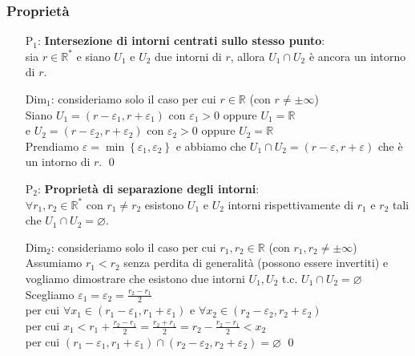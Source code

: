 \documentclass[a4paper]{article}
\begin{document}
\subsubsection*{Proprietà}
\begin{itemize}
	\item[P\(_1\):] \textbf{Intersezione di intorni centrati sullo stesso punto}: \\ sia \(r \in \mathbb{R}^*\) e siano \(U_1\) e \(U_2\) due intorni di \(r\), allora \(U_1 \cap U_2\) è ancora un intorno di \(r\).
	\item[Dim\(_1\):] consideriamo solo il caso per cui \(r \in \mathbb{R}\) (con \(r \neq \pm \infty\)) \\
	Siano \(U_1 = \left( r - \varepsilon_1, r + \varepsilon_1 \right)\) con \(\varepsilon_1 > 0\) oppure \(U_1 = \mathbb{R}\) \\
	e \(U_2 = \left( r - \varepsilon_2, r + \varepsilon_2 \right)\) con \(\varepsilon_2 > 0\) oppure \(U_2 = \mathbb{R}\) \\
	Prendiamo \(\varepsilon = \min \left\{ \varepsilon_1 , \varepsilon_2 \right\}\) e abbiamo che \(U_1 \cap U_2 = \left( r - \varepsilon, r + \varepsilon \right)\) che è un intorno di \(r\). \qed
	
	\item[P\(_2\):] \textbf{Proprietà di separazione degli intorni}: \\ \(\forall r_1, r_2 \in \mathbb{R}^*\) con \(r_1 \neq r_2\) esistono \(U_1\) e \(U_2\) intorni
	rispettivamente di \(r_1\) e \(r_2\) tali che \(U_1 \cap U_2 = \varnothing\).
	\item[Dim\(_2\):] consideriamo solo il caso per cui \(r_1, r_2 \in \mathbb{R}\) (con \(r_1, r_2 \neq \pm \infty\)) \\
	Assumiamo \(r_1 < r_2\) senza perdita di generalità (possono essere invertiti) e vogliamo dimostrare che esistono due intorni \(U_1, U_2\) t.c. \(U_1 \cap U_2 = \varnothing\) \\
	Scegliamo \(\varepsilon_1 = \varepsilon_2 = \displaystyle \frac{r_2 - r_1}{2}\) \\
	per cui \(\forall x_1 \in (r_1 - \varepsilon_1 , r_1 + \varepsilon_1)\) e \(\forall x_2 \in (r_2 - \varepsilon_2 , r_2 + \varepsilon_2)\) \\
	per cui \(x_1 < r_1 + \displaystyle \frac{r_2 - r_1}{2} = \frac{r_2 + r_1}{2} = r_2 - \frac{r_2 - r_1}{2} < x_2\) \\
	per cui \(\left( r_1 - \varepsilon_1, r_1 + \varepsilon_1 \right) \cap \left( r_2 - \varepsilon_2, r_2 + \varepsilon_2 \right) = \varnothing\) \qed
\end{itemize}
\end{document}
